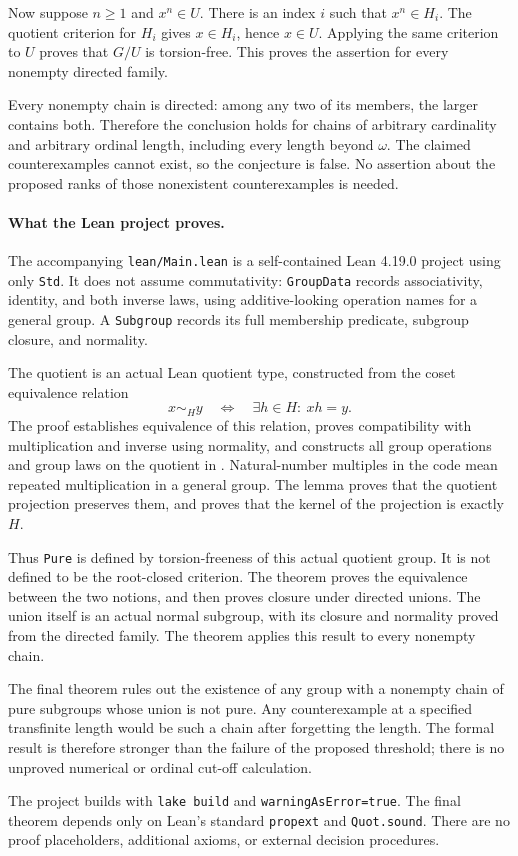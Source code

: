 \documentclass[10pt]{article}
\begin{document}
Now suppose $n\ge1$ and $x^n\in U$. There is an index $i$ such that $x^n\in H_i$. The quotient criterion for $H_i$ gives $x\in H_i$, hence $x\in U$. Applying the same criterion to $U$ proves that $G/U$ is torsion-free. This proves the assertion for every nonempty directed family.

Every nonempty chain is directed: among any two of its members, the larger contains both. Therefore the conclusion holds for chains of arbitrary cardinality and arbitrary ordinal length, including every length beyond $\omega$. The claimed counterexamples cannot exist, so the conjecture is false. No assertion about the proposed ranks of those nonexistent counterexamples is needed.

\newpage
\paragraph{What the Lean project proves.}
The accompanying \texttt{lean/Main.lean} is a self-contained Lean 4.19.0 project using only \texttt{Std}. It does not assume commutativity: \texttt{GroupData} records associativity, identity, and both inverse laws, using additive-looking operation names for a general group. A \texttt{Subgroup} records its full membership predicate, subgroup closure, and normality.

The quotient is an actual Lean quotient type, constructed from the coset equivalence relation
\[
 x\sim_H y\quad\Longleftrightarrow\quad \exists h\in H:\ xh=y.
\]
The proof establishes equivalence of this relation, proves compatibility with multiplication and inverse using normality, and constructs all group operations and group laws on the quotient in . Natural-number multiples in the code mean repeated multiplication in a general group. The lemma  proves that the quotient projection preserves them, and  proves that the kernel of the projection is exactly $H$.

Thus \texttt{Pure} is defined by torsion-freeness of this actual quotient group. It is not defined to be the root-closed criterion. The theorem  proves the equivalence between the two notions, and  then proves closure under directed unions. The union itself is an actual normal subgroup, with its closure and normality proved from the directed family. The theorem  applies this result to every nonempty chain.

The final theorem  rules out the existence of any group with a nonempty chain of pure subgroups whose union is not pure. Any counterexample at a specified transfinite length would be such a chain after forgetting the length. The formal result is therefore stronger than the failure of the proposed threshold; there is no unproved numerical or ordinal cut-off calculation.

The project builds with \texttt{lake build} and \texttt{warningAsError=true}. The final theorem depends only on Lean's standard \texttt{propext} and \texttt{Quot.sound}. There are no proof placeholders, additional axioms, or external decision procedures.
\end{document}
